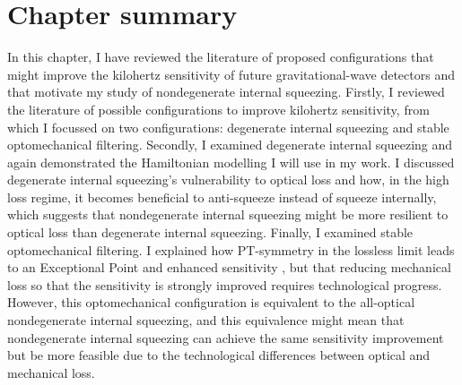 \section{Chapter summary}


In this chapter, I have reviewed the literature of proposed configurations that might improve the kilohertz sensitivity of future gravitational-wave detectors and that motivate my study of nondegenerate internal squeezing. Firstly, I reviewed the literature of possible configurations to improve kilohertz sensitivity, from which I focussed on two configurations: degenerate internal squeezing and stable optomechanical filtering. Secondly, I examined degenerate internal squeezing and again demonstrated the Hamiltonian modelling I will use in my work. I discussed degenerate internal squeezing's vulnerability to optical loss and how, in the high loss regime, it becomes beneficial to anti-squeeze instead of squeeze internally, which suggests that nondegenerate internal squeezing might be more resilient to optical loss than degenerate internal squeezing. 
Finally, I examined stable optomechanical filtering. %
I explained how PT-symmetry in the lossless limit leads to an Exceptional Point and enhanced sensitivity , but that reducing mechanical loss so that the sensitivity is strongly improved requires technological progress. However, this optomechanical configuration is equivalent to the all-optical nondegenerate internal squeezing, and this equivalence might mean that nondegenerate internal squeezing can achieve the same sensitivity improvement but be more feasible due to the technological differences between optical and mechanical loss.


